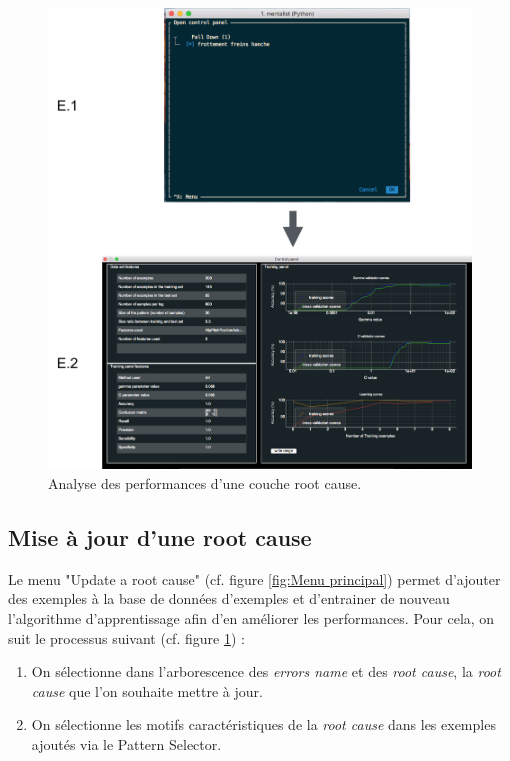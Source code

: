 \begin{figure}[H]
	\centering\includegraphics[width=15cm]{images/perf_menu.png}
	\caption[Analyse des performances d'une couche root cause]{Analyse des performances d'une couche root cause.}
	\label{fig: Analyse des performances d'une couche root cause}
\end{figure} 


\subsection{Mise à jour d'une root cause}
\label{Industrialisation du produit: Utilisation suggérée des outils: Mise à jour d'une root cause}
Le menu "Update a root cause"  (cf. figure \ref{fig:Menu principal}) permet d'ajouter des exemples à la base de données d'exemples et d'entrainer de nouveau l'algorithme d'apprentissage afin d'en améliorer les performances. Pour cela, on suit le processus suivant (cf. figure \ref{fig: Analyse des performances d'une couche root cause}) : 
\begin{enumerate}
	\item On sélectionne dans l'arborescence des \emph{errors name} et des \emph{root cause}, la \emph{root cause} que l'on souhaite mettre à jour.
	\item On sélectionne les motifs caractéristiques de la \emph{root cause} dans les exemples ajoutés via le Pattern Selector.
\end{enumerate}


